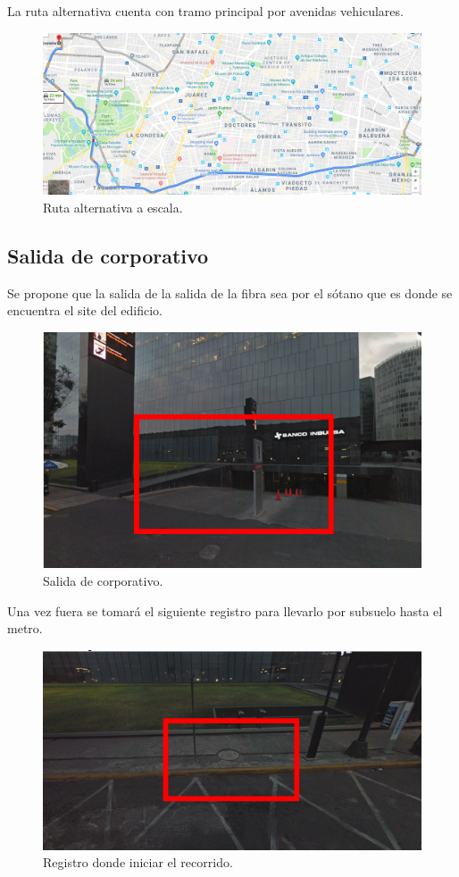 \documentclass[12pt,letterpaper]{article}
\begin{document}
La ruta alternativa cuenta con tramo principal por avenidas 
vehiculares.
\begin{figure}[ht]
    \centering
    \includegraphics[width=.9\textwidth]{f3.png}
    \caption{Ruta alternativa a escala.}
\end{figure}

\newpage
\subsection{Salida de corporativo}
Se propone que la salida de la salida de la fibra sea por el 
sótano que es donde se encuentra el site del edificio.
\begin{figure}[ht]
    \centering
    \includegraphics[width=.6\textwidth]{f0.png}
    \caption{Salida de corporativo.}
\end{figure}

Una vez fuera se tomará el siguiente registro para llevarlo por 
subsuelo hasta el metro.
\begin{figure}[ht]
    \centering
    \includegraphics[width=.7\textwidth]{f1.png}
    \caption{Registro donde iniciar el recorrido.}
\end{figure}
\end{document}
